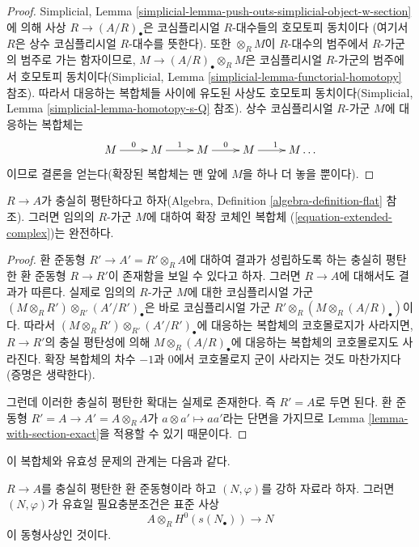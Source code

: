 \begin{proof}
Simplicial, Lemma
\ref{simplicial-lemma-push-outs-simplicial-object-w-section}에 의해 사상
$R \to (A/R)_\bullet$은 코심플리시얼 $R$-대수들의 호모토피 동치이다
(여기서 $R$은 상수 코심플리시얼 $R$-대수를 뜻한다). 또한
$\otimes_R M$이 $R$-대수의 범주에서 $R$-가군의 범주로 가는 함자이므로,
$M \to (A/R)_\bullet \otimes_R M$은 코심플리시얼 $R$-가군의 범주에서
호모토피 동치이다(Simplicial, Lemma
\ref{simplicial-lemma-functorial-homotopy} 참조). 따라서 대응하는
복합체들 사이에 유도된 사상도 호모토피 동치이다(Simplicial, Lemma
\ref{simplicial-lemma-homotopy-s-Q} 참조). 상수 코심플리시얼 $R$-가군
$M$에 대응하는 복합체는
$$
\xymatrix{
M \ar[r]^0 & M \ar[r]^1 & M \ar[r]^0 & M \ar[r]^1 & M \ldots
}
$$
이므로 결론을 얻는다(확장된 복합체는 맨 앞에 $M$을 하나 더 놓을 뿐이다).
\end{proof}

\begin{lemma}
\label{lemma-ff-exact}
$R \to A$가 충실히 평탄하다고 하자(Algebra, Definition
\ref{algebra-definition-flat} 참조). 그러면 임의의 $R$-가군 $M$에 대하여
확장 코체인 복합체 (\ref{equation-extended-complex})는 완전하다.
\end{lemma}

\begin{proof}
환 준동형 $R' \to A' = R' \otimes_R A$에 대하여 결과가 성립하도록 하는
충실히 평탄한 환 준동형 $R \to R'$이 존재함을 보일 수 있다고 하자. 그러면
$R \to A$에 대해서도 결과가 따른다. 실제로 임의의 $R$-가군 $M$에 대한
코심플리시얼 가군
$(M \otimes_R R') \otimes_{R'} (A'/R')_\bullet$은 바로 코심플리시얼 가군
$R' \otimes_R (M \otimes_R (A/R)_\bullet)$이다. 따라서
$(M \otimes_R R') \otimes_{R'} (A'/R')_\bullet$에 대응하는 복합체의
코호몰로지가 사라지면, $R \to R'$의 충실 평탄성에 의해
$M \otimes_R (A/R)_\bullet$에 대응하는 복합체의 코호몰로지도 사라진다.
확장 복합체의 차수 $-1$과 $0$에서 코호몰로지 군이 사라지는 것도 마찬가지다
(증명은 생략한다).

\medskip\noindent
그런데 이러한 충실히 평탄한 확대는 실제로 존재한다. 즉 $R' = A$로 두면 된다.
환 준동형 $R' = A \to A' = A \otimes_R A$가
$a \otimes a' \mapsto aa'$라는 단면을 가지므로 Lemma
\ref{lemma-with-section-exact}을 적용할 수 있기 때문이다.
\end{proof}

\noindent
이 복합체와 유효성 문제의 관계는 다음과 같다.

\begin{lemma}
\label{lemma-recognize-effective}
$R \to A$를 충실히 평탄한 환 준동형이라 하고 $(N, \varphi)$를 강하 자료라
하자. 그러면 $(N, \varphi)$가 유효일 필요충분조건은 표준 사상
$$
A \otimes_R H^0(s(N_\bullet)) \longrightarrow N
$$
이 동형사상인 것이다.
\end{lemma}

